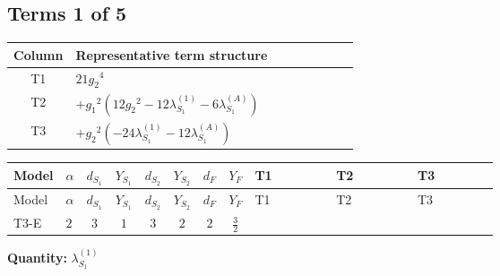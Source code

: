 \documentclass[8pt]{article}
\begin{document}
\begin{landscape}
\subsection*{Terms 1 of 5}
\begin{center}
\begin{tabular}{@{}c >{\raggedright\arraybackslash}p{0.82\linewidth}@{}}
\toprule
Column & Representative term structure \\
\midrule
T1 & \(\displaystyle 21 {g_2}^4\) \\
\midrule
T2 & \(\displaystyle +{g_1}^2 \left(12 {g_2}^2-12 {\lambda_{S_1}^{(1)}}-6 {\lambda_{S_1}^{(A)}}\right)\) \\
\midrule
T3 & \(\displaystyle +{g_2}^2 (-24 {\lambda_{S_1}^{(1)}}-12 {\lambda_{S_1}^{(A)}})\) \\
\midrule
\bottomrule
\end{tabular}
\end{center}
\smallskip
\tiny
\begin{longtable}{@{}llcccccc >{\raggedright\arraybackslash}p{0.21\linewidth} >{\raggedright\arraybackslash}p{0.21\linewidth} >{\raggedright\arraybackslash}p{0.21\linewidth}@{}}
\toprule
Model & $\alpha$ & $d_{S_1}$ & $Y_{S_1}$ & $d_{S_2}$ & $Y_{S_2}$ & $d_F$ & $Y_F$ & T1 & T2 & T3 \\
\midrule
\endfirsthead
\toprule
Model & $\alpha$ & $d_{S_1}$ & $Y_{S_1}$ & $d_{S_2}$ & $Y_{S_2}$ & $d_F$ & $Y_F$ & T1 & T2 & T3 \\
\midrule
\endhead
T3-E & $2$ & $3$ & $1$ & $3$ & $2$ & $2$ & $\frac{3}{2}$ & \scriptsize\adjustbox{max width=\linewidth}{$\begin{gathered} 21 {g_2}^4\end{gathered}$} & \scriptsize\adjustbox{max width=\linewidth}{$\begin{gathered} +{g_1}^2 \left(12 {g_2}^2-12 {\lambda_{S_1}^{(1)}}-6 {\lambda_{S_1}^{(A)}}\right)\end{gathered}$} & \scriptsize\adjustbox{max width=\linewidth}{$\begin{gathered} +{g_2}^2 (-24 {\lambda_{S_1}^{(1)}}-12 {\lambda_{S_1}^{(A)}})\end{gathered}$} \\
\midrule
\bottomrule
\end{longtable}
\clearpage
\noindent\textbf{Quantity: }$\lambda_{S_1}^{(1)}$\par\smallskip

\end{landscape}
\end{document}
